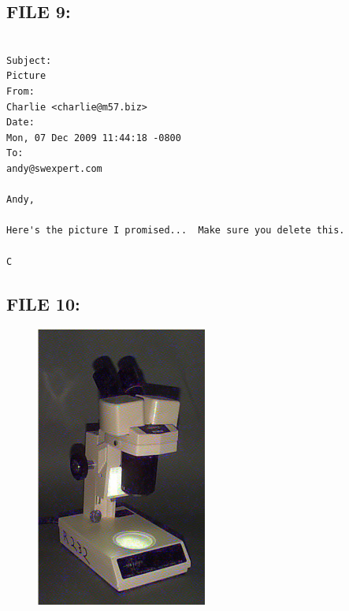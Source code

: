 \subsection{FILE 9:}
\label{sec:charlie_daten_9}

\begin{lstlisting}

Subject:
Picture
From:
Charlie <charlie@m57.biz>
Date:
Mon, 07 Dec 2009 11:44:18 -0800
To:
andy@swexpert.com

Andy,

Here's the picture I promised...  Make sure you delete this.

C

\end{lstlisting}

\subsection{FILE 10:}
\label{sec:charlie_daten_10}

\begin{figure}[H]
	\centering
	\includegraphics[width=0.5\textwidth]{daten/pics/microscope1.jpg}
\end{figure}
